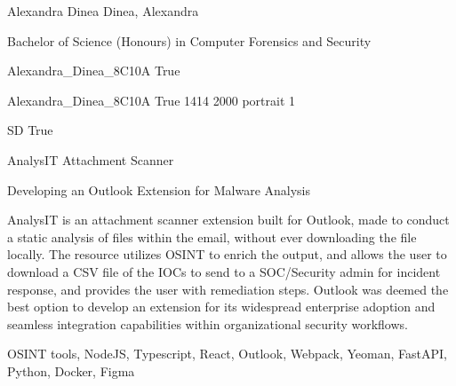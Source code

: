 \documentclass[twoside]{report}
\begin{document}
\begingroup{}\relax



\def\Key{Alexandra_Dinea_8C10A}

{Alexandra Dinea}
{Dinea, Alexandra}

{Bachelor of Science (Honours) in Computer Forensics and Security}

{Alexandra_Dinea_8C10A}
{True}

{Alexandra_Dinea_8C10A}
{True}
{1414}
{2000}
{portrait}
{1}

{SD}
{True}

{AnalysIT Attachment Scanner}

{Developing an Outlook Extension for Malware Analysis}

{AnalysIT is an attachment scanner extension built for Outlook, made to conduct a static analysis of files within the email, without ever downloading the file locally. The resource utilizes OSINT to enrich the output, and allows the user to download a CSV file of the IOCs to send to a SOC/Security admin for incident response, and provides the user with remediation steps. Outlook was deemed the best option to develop an extension for its widespread enterprise adoption and seamless integration capabilities within organizational security workflows.}

{OSINT tools, NodeJS, Typescript, React, Outlook, Webpack, Yeoman, FastAPI, Python, Docker, Figma}
\end{document}
